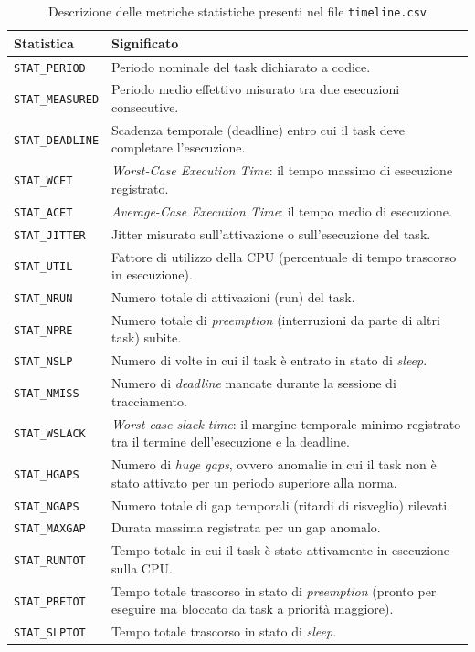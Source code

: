 \begin{table}[H]
	\centering
	\begin{tabular}{|l|p{10cm}|}
		\hline
		\textbf{Statistica} & \textbf{Significato} \\
		\hline
		\texttt{STAT\_PERIOD} & Periodo nominale del task dichiarato a codice. \\
		\texttt{STAT\_MEASURED} & Periodo medio effettivo misurato tra due esecuzioni consecutive. \\
		\texttt{STAT\_DEADLINE} & Scadenza temporale (deadline) entro cui il task deve completare l'esecuzione. \\
		\texttt{STAT\_WCET} & \textit{Worst-Case Execution Time}: il tempo massimo di esecuzione registrato. \\
		\texttt{STAT\_ACET} & \textit{Average-Case Execution Time}: il tempo medio di esecuzione. \\
		\texttt{STAT\_JITTER} & Jitter misurato sull'attivazione o sull'esecuzione del task. \\
		\texttt{STAT\_UTIL} & Fattore di utilizzo della CPU (percentuale di tempo trascorso in esecuzione). \\
		\texttt{STAT\_NRUN} & Numero totale di attivazioni (run) del task. \\
		\texttt{STAT\_NPRE} & Numero totale di \textit{preemption} (interruzioni da parte di altri task) subite. \\
		\texttt{STAT\_NSLP} & Numero di volte in cui il task è entrato in stato di \textit{sleep}. \\
		\texttt{STAT\_NMISS} & Numero di \textit{deadline} mancate durante la sessione di tracciamento. \\
		\texttt{STAT\_WSLACK} & \textit{Worst-case slack time}: il margine temporale minimo registrato tra il termine dell'esecuzione e la deadline. \\
		\texttt{STAT\_HGAPS} & Numero di \textit{huge gaps}, ovvero anomalie in cui il task non è stato attivato per un periodo superiore alla norma. \\
		\texttt{STAT\_NGAPS} & Numero totale di gap temporali (ritardi di risveglio) rilevati. \\
		\texttt{STAT\_MAXGAP} & Durata massima registrata per un gap anomalo. \\
		\texttt{STAT\_RUNTOT} & Tempo totale in cui il task è stato attivamente in esecuzione sulla CPU. \\
		\texttt{STAT\_PRETOT} & Tempo totale trascorso in stato di \textit{preemption} (pronto per eseguire ma bloccato da task a priorità maggiore). \\
		\texttt{STAT\_SLPTOT} & Tempo totale trascorso in stato di \textit{sleep}. \\
		\hline
	\end{tabular}
	\caption{Descrizione delle metriche statistiche presenti nel file \texttt{timeline.csv}}
	\label{tab:timeline_stats}
\end{table}
